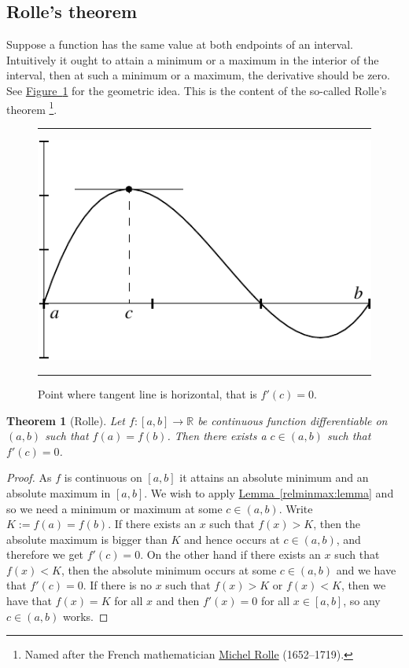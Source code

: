 \documentclass[12pt]{book}
\newenvironment{myfigureht}{%
\begin{figure}[h!t]
\noindent\rule{\textwidth}{0.4pt}\vspace{12pt}\par\centering}%
{\par\noindent\rule{\textwidth}{0.4pt}
\end{figure}}
\newcommand{\R}{{\mathbb{R}}}
\theoremstyle{plain}
\newtheorem{thm}{Theorem}[section]
\theoremstyle{remark}
\theoremstyle{definition}
\theoremstyle{exercise}
\theoremstyle{example}
\newcommand{\figureref}[1]{\hyperref[#1]{Figure~\ref*{#1}}}
\newcommand{\lemmaref}[1]{\hyperref[#1]{Lemma~\ref*{#1}}}
\begin{document}
\subsection{Rolle's theorem}

Suppose a function has the same value at both endpoints of an interval.
Intuitively it ought to attain a minimum or a maximum in the interior of the
interval,
then at such a minimum or a maximum, the derivative should be zero.
See \figureref{rollefig} for the geometric idea.  This is the content of the
so-called Rolle's theorem%
\footnote{Named after the French mathematician
\href{https://en.wikipedia.org/wiki/Michel_Rolle}{Michel Rolle}
(1652--1719).}.

\begin{myfigureht}
\includegraphics{figures/rollefig}
\caption{Point where tangent line is horizontal, that is $f'(c) =
0$.\label{rollefig}}
\end{myfigureht}

\begin{thm}[Rolle] \label{thm:rolle}
Let $f \colon [a,b] \to \R$ be continuous function
differentiable on $(a,b)$ such that $f(a) = f(b)$.
Then there exists a $c \in (a,b)$ such that $f'(c) = 0$.
\end{thm}

\begin{proof}
As $f$ is continuous on $[a,b]$ it attains an absolute minimum and an
absolute 
maximum in $[a,b]$.  We wish to apply \lemmaref{relminmax:lemma} and
so we need a minimum or maximum at some $c \in (a,b)$.
Write $K := f(a) = f(b)$.
If there exists an $x$ such that $f(x) > K$, then the absolute
maximum is bigger than $K$ and hence occurs at $c \in (a,b)$, and
therefore we get $f'(c) = 0$.  On the other hand if there exists an $x$
such that $f(x) < K$, then the absolute minimum occurs at some
$c \in (a,b)$ and we have that $f'(c) = 0$.  If there is no $x$ such that
$f(x) > K$ or
$f(x) < K$, then we have that $f(x) = K$ for all $x$ and then
$f'(x) = 0$ for all $x \in [a,b]$, so any $c \in (a,b)$ works.
\end{proof}
\end{document}
